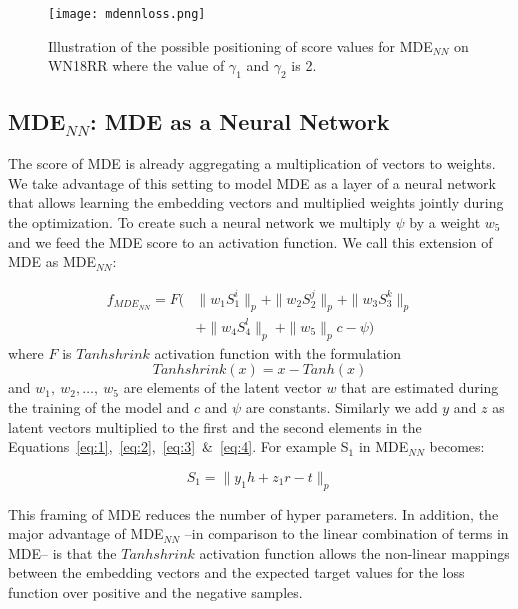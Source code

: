 \documentclass{ecai}
\begin{document}
\begin{figure}[t]
\centering
\texttt{[image: mdennloss.png]}
\caption{Illustration of the possible positioning of score  values for MDE$_{NN}$ on WN18RR where the value of $\gamma_1$ and $\gamma_2$ is 2.}
\label{fig:mdennloss}
\end{figure}

\subsection{MDE$_{NN}$: MDE as a Neural Network}

The score of MDE is already aggregating a multiplication of vectors to weights. We take advantage of this setting to model MDE as a layer of a neural network that allows learning the embedding vectors and multiplied weights jointly during the optimization. To create such a neural network we multiply $\psi$ by a weight $w_5$ and we feed the MDE score to an activation function. We call this extension of MDE as MDE$_{NN}$:

\begin{equation}\label{eq:9}
\begin{split}
f_{MDE_{NN}} = F( & \parallel w_1 S_1^i\parallel_p + \parallel w_2 S_2^j\parallel_p + \parallel w_3 S_3^k\parallel_p \\&+ \parallel w_4S_4^l\parallel_p~ + \parallel w_5 \parallel_p c - \psi ) 
\end{split}
\end{equation}
where $F$ is $Tanhshrink$ activation function with the formulation 
\begin{equation}\label{eq:10}
Tanhshrink(x)= x - Tanh(x) 
\end{equation}
and $w_1,~w_2,\dots,~w_5$ are elements of the latent vector $w$ that are estimated during the training of the model and $c$ and $\psi$ are constants. Similarly we add $y$ and $z$ as latent vectors multiplied to the first and the second elements in the Equations~\ref{eq:1},~\ref{eq:2},~\ref{eq:3}~\&~\ref{eq:4}. For example S$_1$ in MDE$_{NN}$ becomes:

\begin{equation}\label{eq:11}
    S_1 = \parallel y_1 h+ z_1 r - t \parallel_p
\end{equation}

This framing of MDE reduces the number of hyper parameters. In addition, the major advantage of MDE$_{NN}$ --in comparison to the linear combination of terms in MDE-- is that the $Tanhshrink$ activation function allows the non-linear mappings between the embedding vectors and the expected target values for the loss function over positive and the negative samples. 
\end{document}

